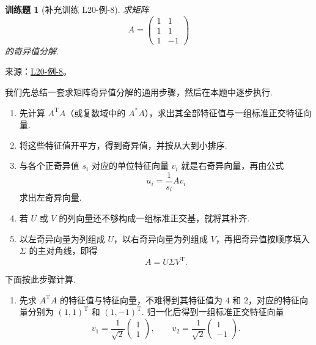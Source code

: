 \documentclass[12pt,fontset=fandol]{ctexart}
\newtheorem{exercise}{训练题}[section]
\begin{document}
\begin{exercise}[补充训练 L20-例-8]\label{prob:L20-例-8}
求矩阵
    \[
        A = \begin{pmatrix}
            1 & 1  \\
            1 & 1  \\
            1 & -1
        \end{pmatrix}
    \]
    的奇异值分解.
\end{exercise}
\noindent 来源：\href{https://github.com/yhwu-is/Linear-Algebra-Left-Undone/blob/new/%E8%AE%B2%E4%B9%89/%E4%B8%93%E9%A2%98/20%20%E5%86%85%E7%A7%AF%E7%A9%BA%E9%97%B4%E4%B8%8A%E7%9A%84%E7%AE%97%E5%AD%90.tex}{L20-例-8}。
\begin{solve}
我们先总结一套求矩阵奇异值分解的通用步骤，然后在本题中逐步执行.

    \begin{enumerate}
        \item 先计算 $A^{\mathrm{T}}A$（或复数域中的 $A^*A$），求出其全部特征值与一组标准正交特征向量.

        \item 将这些特征值开平方，得到奇异值，并按从大到小排序.

        \item 与各个正奇异值 $s_i$ 对应的单位特征向量 $v_i$ 就是右奇异向量，再由公式
              \[
                  u_i = \frac{1}{s_i}Av_i
              \]
              求出左奇异向量.

        \item 若 $U$ 或 $V$ 的列向量还不够构成一组标准正交基，就将其补齐.

        \item 以左奇异向量为列组成 $U$，以右奇异向量为列组成 $V$，再把奇异值按顺序填入 $\Sigma$ 的主对角线，即得
              \[
                  A = U\Sigma V^{\mathrm{T}}.
              \]
    \end{enumerate}

    下面按此步骤计算.

    \begin{enumerate}
        \item 先求 $A^{\mathrm{T}}A$ 的特征值与特征向量，不难得到其特征值为 $4$ 和 $2$，对应的特征向量分别为 $(1, 1)^{\mathrm{T}}$ 和 $(1, -1)^{\mathrm{T}}$. 归一化后得到一组标准正交特征向量
              \[
                  v_1 = \frac{1}{\sqrt{2}}\begin{pmatrix}
                      1 \\
                      1
                  \end{pmatrix},\qquad
                  v_2 = \frac{1}{\sqrt{2}}\begin{pmatrix}
                      1  \\
                      -1
                  \end{pmatrix}.
              \]


\end{enumerate}
\end{solve}
\end{document}
